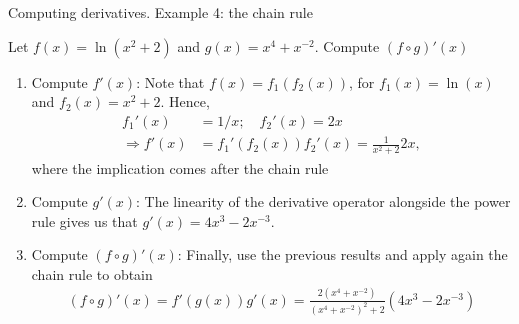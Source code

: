 \documentclass[9pt]{beamer}
\begin{document}
\begin{frame}{Computing derivatives. Example 4: the chain rule}

        Let $f(x) = \ln(x^2 + 2)$ and $g(x) = x^4 + x^{-2}$. Compute $(f\circ g)'(x)$

        \begin{enumerate}[leftmargin = 0.5cm, label = \arabic*., rightmargin = 0.2cm]

        \item Compute $f'(x)$: Note that $f(x) = f_1(f_2(x))$, for $f_1(x) = \ln(x)$ and $f_2(x) = x^2 + 2$. Hence,
        \begin{align*}
             f_1'(x) &= 1/x; \quad f_2'(x) = 2x \\
            \Longrightarrow f'(x) &= f_1'(f_2(x))f_2'(x) = \frac{1}{x^2 + 2}2x,
        \end{align*}
        where the implication comes after the chain rule

        \item Compute $g'(x)$: The linearity of the derivative operator alongside the power rule gives us that $g'(x) = 4x^3 - 2x^{-3}$.

        \item Compute $(f\circ g)'(x)$: Finally, use the previous results and apply again the chain rule to obtain        
        \begin{align*}
            (f\circ g)'(x) = f'(g(x))g'(x) = \frac{2(x^4 + x^{-2})}{(x^4 + x^{-2})^2 + 2}(4x^3 - 2x^{-3})
        \end{align*}
        
        \end{enumerate}
    
\end{frame}




    
\end{document}
